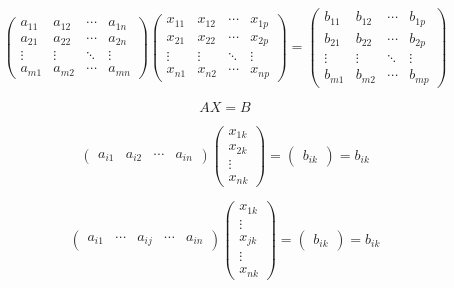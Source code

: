 \documentclass[
]{book}
\theoremstyle{definition}
\theoremstyle{definition}
\theoremstyle{definition}
\theoremstyle{definition}
\theoremstyle{remark}
\begin{document}
\[
\begin{pmatrix}a_{{\scriptscriptstyle 11}} & a_{{\scriptscriptstyle 12}} & \cdots & a_{{\scriptscriptstyle 1n}}\\
a_{{\scriptscriptstyle 21}} & a_{{\scriptscriptstyle 22}} & \cdots & a_{{\scriptscriptstyle 2n}}\\
\vdots & \vdots & \ddots & \vdots\\
a_{{\scriptscriptstyle m1}} & a_{{\scriptscriptstyle m2}} & \cdots & a_{{\scriptscriptstyle mn}}
\end{pmatrix}\begin{pmatrix}x_{{\scriptscriptstyle 11}} & x_{{\scriptscriptstyle 12}} & \cdots & x_{{\scriptscriptstyle 1p}}\\
x_{{\scriptscriptstyle 21}} & x_{{\scriptscriptstyle 22}} & \cdots & x_{{\scriptscriptstyle 2p}}\\
\vdots & \vdots & \ddots & \vdots\\
x_{{\scriptscriptstyle n1}} & x_{{\scriptscriptstyle n2}} & \cdots & x_{{\scriptscriptstyle np}}
\end{pmatrix}=\begin{pmatrix}b_{{\scriptscriptstyle 11}} & b_{{\scriptscriptstyle 12}} & \cdots & b_{{\scriptscriptstyle 1p}}\\
b_{{\scriptscriptstyle 21}} & b_{{\scriptscriptstyle 22}} & \cdots & b_{{\scriptscriptstyle 2p}}\\
\vdots & \vdots & \ddots & \vdots\\
b_{{\scriptscriptstyle m1}} & b_{{\scriptscriptstyle m2}} & \cdots & b_{{\scriptscriptstyle mp}}
\end{pmatrix}
\]

\[
AX=B
\]

\[
\begin{pmatrix}a_{{\scriptscriptstyle i1}} & a_{{\scriptscriptstyle i2}} & \cdots & a_{{\scriptscriptstyle in}}\end{pmatrix}\begin{pmatrix}x_{{\scriptscriptstyle 1k}}\\
x_{{\scriptscriptstyle 2k}}\\
\vdots\\
x_{{\scriptscriptstyle nk}}
\end{pmatrix}=\begin{pmatrix}b_{{\scriptscriptstyle ik}}\end{pmatrix}=b_{{\scriptscriptstyle ik}}
\]

\[
\begin{pmatrix}a_{{\scriptscriptstyle i1}} & \cdots & a_{{\scriptscriptstyle ij}} & \cdots & a_{{\scriptscriptstyle in}}\end{pmatrix}\begin{pmatrix}x_{{\scriptscriptstyle 1k}}\\
\vdots\\
x_{{\scriptscriptstyle jk}}\\
\vdots\\
x_{{\scriptscriptstyle nk}}
\end{pmatrix}=\begin{pmatrix}b_{{\scriptscriptstyle ik}}\end{pmatrix}=b_{{\scriptscriptstyle ik}}
\]
\end{document}
